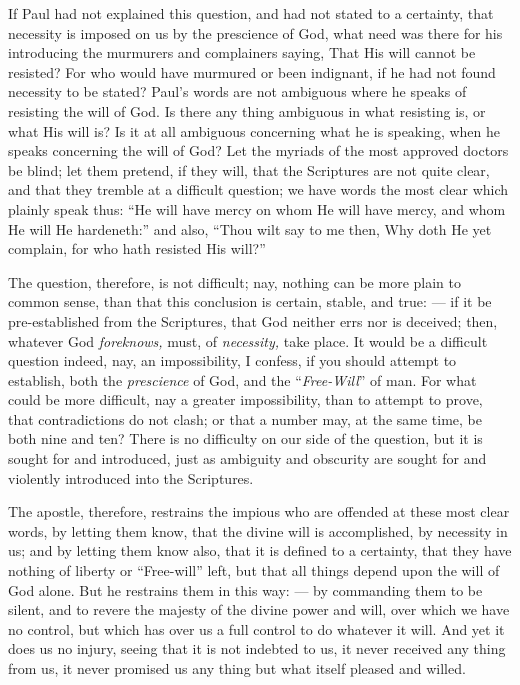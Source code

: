 If Paul had not explained this question, and had not stated to a certainty, that necessity is imposed on us by the prescience of God, what need was there for his introducing the murmurers and complainers saying, That His will cannot be resisted? For who would have murmured or been indignant, if he had not found necessity to be stated? Paul’s words are not ambiguous where he speaks of resisting the will of God. Is there any thing ambiguous in what resisting is, or what His will is? Is it at all ambiguous concerning what he is speaking, when he speaks concerning the will of God? Let the myriads of the most approved doctors be blind; let them pretend, if they will, that the Scriptures are not quite clear, and that they tremble at a difficult question; we have words the most clear which plainly speak thus: “He will have mercy on whom He will have mercy, and whom He will He hardeneth:” and also, “Thou wilt say to me then, Why doth He yet complain, for who hath resisted His will?”

The question, therefore, is not difficult; nay, nothing can be more plain to common sense, than that this conclusion is certain, stable, and true: — if it be pre-established from the Scriptures, that God neither errs nor is deceived; then, whatever God \emph{foreknows, }must, of \emph{necessity, }take place. It would be a difficult question indeed, nay, an impossibility, I confess, if you should attempt to establish, both the \emph{prescience }of God, and the “\emph{Free-Will}” of man. For what could be more difficult, nay a greater impossibility, than to attempt to prove, that contradictions do not clash; or that a number may, at the same time, be both nine and ten? There is no difficulty on our side of the question, but it is sought for and introduced, just as ambiguity and obscurity are sought for and violently introduced into the Scriptures.

The apostle, therefore, restrains the impious who are offended at these most clear words, by letting them know, that the divine will is accomplished, by necessity in us; and by letting them know also, that it is defined to a certainty, that they have nothing of liberty or “Free-will” left, but that all things depend upon the will of God alone. But he restrains them in this way: — by commanding them to be silent, and to revere the majesty of the divine power and will, over which we have no control, but which has over us a full control to do whatever it will. And yet it does us no injury, seeing that it is not indebted to us, it never received any thing from us, it never promised us any thing but what itself pleased and willed.

